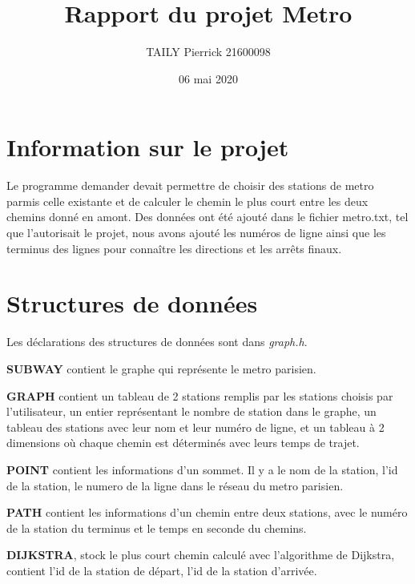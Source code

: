 \documentclass[a4]{article}
\author{TAILY Pierrick 21600098}
\title{Rapport du projet Metro}
\date{06 mai 2020}
\begin{document}
\maketitle

\section{Information sur le projet}
Le programme demander devait permettre de choisir des stations de metro parmis celle existante et de calculer le chemin le plus court entre les deux chemins donné en amont.\newline
Des données ont été ajouté dans le fichier metro.txt, tel que l'autorisait le projet, nous avons ajouté les numéros de ligne ainsi que les terminus des lignes pour connaître les directions et les arrêts finaux.\newline

\section{Structures de données}

Les déclarations des structures de données sont dans \textit{graph.h}. \newline

\textbf{SUBWAY} contient le graphe qui représente le metro parisien.\newline

\textbf{GRAPH} contient un tableau de 2 stations remplis par les stations choisis par l'utilisateur, un entier représentant 
le nombre de station dans le graphe, un tableau des stations avec leur nom et leur numéro de ligne, et un tableau à 2 dimensions où chaque chemin est déterminés avec leurs temps de trajet.\newline

\textbf{POINT} contient les informations d'un sommet. Il y a le nom de la station, l'id de la station, le numero de la ligne dans le réseau du metro parisien.\newline

\textbf{PATH} contient les informations d'un chemin entre deux stations, avec le numéro de la station du terminus et le temps en seconde du chemins.\newline

\textbf{DIJKSTRA}, stock le plus court chemin calculé avec l'algorithme de Dijkstra, contient l'id de la station de départ, l'id de la station d'arrivée.\newline
\end{document}
